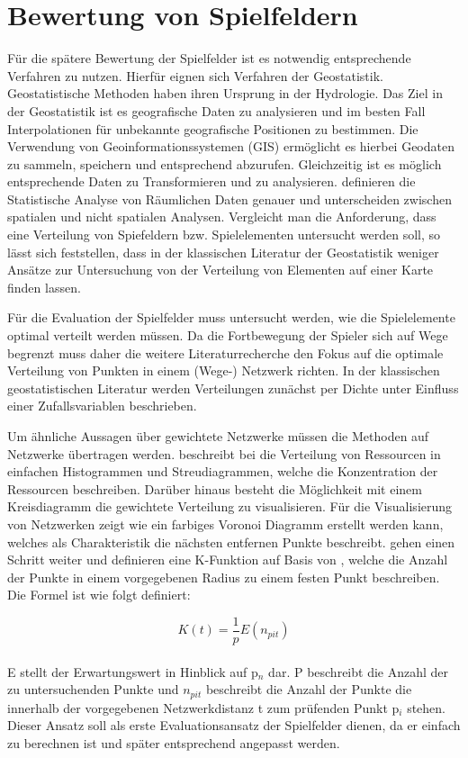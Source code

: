 \section{Bewertung von Spielfeldern}
\label{ch3:s:geostatistik}

Für die spätere Bewertung der Spielfelder ist es notwendig entsprechende Verfahren zu nutzen.
Hierfür eignen sich Verfahren der Geostatistik. Geostatistische Methoden haben ihren Ursprung in der Hydrologie.\cite{Bloschl.2006}
Das Ziel in der Geostatistik ist es geografische Daten zu analysieren und im besten Fall Interpolationen für unbekannte geografische Positionen zu bestimmen.\cite{Liebhold.1993}
Die Verwendung von Geoinformationssystemen (GIS) ermöglicht es hierbei Geodaten zu sammeln, speichern und entsprechend abzurufen. Gleichzeitig ist es möglich entsprechende Daten zu Transformieren und zu analysieren.\cite{Kitanidis.1997}
\textcite{Bailey.1995} definieren die Statistische Analyse von Räumlichen Daten genauer und unterscheiden zwischen spatialen und nicht spatialen Analysen. Vergleicht man die Anforderung, dass eine Verteilung von Spiefeldern bzw. Spielelementen untersucht werden soll, so lässt sich feststellen, dass in der klassischen Literatur der Geostatistik weniger Ansätze zur Untersuchung von der Verteilung von Elementen auf einer Karte finden lassen.

Für die Evaluation der Spielfelder muss untersucht werden, wie die Spielelemente optimal verteilt werden müssen.
Da die Fortbewegung der Spieler sich auf Wege begrenzt muss daher die weitere Literaturrecherche den Fokus auf die optimale Verteilung von Punkten in einem (Wege-) Netzwerk richten.
In der klassischen geostatistischen Literatur werden Verteilungen zunächst per Dichte unter Einfluss einer Zufallsvariablen beschrieben.\cite{Heinrich.1992}

Um ähnliche Aussagen über gewichtete Netzwerke müssen die Methoden auf Netzwerke übertragen werden.
\textcite{Goovaerts.1997} beschreibt bei die Verteilung von Ressourcen in einfachen Histogrammen und Streudiagrammen, welche die Konzentration der Ressourcen beschreiben. Darüber hinaus besteht die Möglichkeit mit einem Kreisdiagramm die gewichtete Verteilung zu visualisieren.\cite{Diggle.2007}
Für die Visualisierung von Netzwerken zeigt \textcite{Okabe.2006} wie ein farbiges Voronoi Diagramm erstellt werden kann, welches als Charakteristik die nächsten entfernen Punkte beschreibt. \textcite{Spooner.2004} gehen einen Schritt weiter und definieren eine K-Funktion auf Basis von \textcite{Okabe.2001}, welche die Anzahl der Punkte in einem vorgegebenen Radius zu einem festen Punkt beschreiben.
Die Formel ist wie folgt definiert:

\begin{equation}
K(t) = \frac{1}{p}E(n_{pit})
\end{equation}
\\
E stellt der Erwartungswert in Hinblick auf p$_n$ dar. P beschreibt die Anzahl der zu untersuchenden Punkte und $n_{pit}$ beschreibt die Anzahl der Punkte die innerhalb der vorgegebenen Netzwerkdistanz t zum prüfenden Punkt p$_i$ stehen.
Dieser Ansatz soll als erste Evaluationsansatz der Spielfelder dienen, da er einfach zu berechnen ist und später entsprechend angepasst werden.


